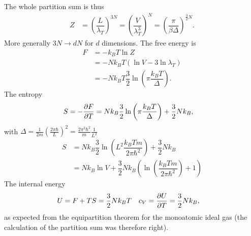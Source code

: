 \documentclass[a4paper,10pt]{article}
\numberwithin{equation}{section}
\begin{document}
\begin{multicols}{2}
\normalsize

The whole partition sum is thus
\begin{align} 
  Z &= \left(\dfrac{L}{\lambda _T}\right)^{3N}=\left(\dfrac{V}{\lambda _T^3}\right)^N=\left(\dfrac{\pi }{\beta \Delta }\right)^{\tfrac{3}{2}N}
.\end{align} 
More generally $3N\rightarrow dN$ for $d$ dimensions.
The free energy is
\begin{align} 
  F &= -k_BT\ln Z\\
    &= -Nk_BT\left(\ln V - 3\ln \lambda _T\right)\\
    &= -Nk_BT\dfrac{3}{2}\ln \left(\pi \dfrac{k_BT}{\Delta }\right)
.\end{align} 
The entropy
\begin{align} 
  S &= -\diffp[]{F}{T} = Nk_B\dfrac{3}{2}\ln\left(\pi \dfrac{k_BT}{\Delta }\right)+\dfrac{3}{2}Nk_B
,\end{align} 
with $\Delta =\tfrac{1}{2m}\left(\tfrac{2\pi \hbar }{L}\right)^2=\tfrac{2\pi ^2\hbar ^2}{m}\tfrac{1}{L^2}$
\begin{align} 
  S &= Nk_B\dfrac{3}{2}\ln \left(L^2\dfrac{k_BTm}{2\pi \hbar ^2}\right)+\dfrac{3}{2}Nk_B\\
    &= Nk_B\ln V + \dfrac{3}{2}Nk_B\left(\ln\left(\dfrac{k_BTm}{2\pi \hbar ^2}\right) + 1\right)
\end{align} 
The internal energy
\begin{align} 
  U &= F+TS = \dfrac{3}{2}Nk_BT & c_V &= \diffp[]{U}{T}=\dfrac{3}{2}Nk_B
,\end{align} 
as expected from the equipartition theorem for the monoatomic ideal gas (the calculation of the partition sum was therefore right).


\end{multicols}
\end{document}
